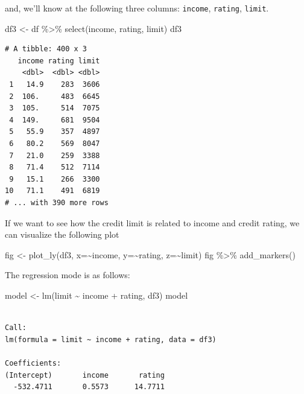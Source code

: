 \documentclass[
  letterpaper,
  DIV=11,
  numbers=noendperiod]{scrartcl}
\newenvironment{Shaded}{\begin{snugshade}}{\end{snugshade}}
\newcommand{\AttributeTok}[1]{\textcolor[rgb]{0.40,0.45,0.13}{#1}}
\newcommand{\FunctionTok}[1]{\textcolor[rgb]{0.28,0.35,0.67}{#1}}
\newcommand{\NormalTok}[1]{\textcolor[rgb]{0.00,0.23,0.31}{#1}}
\newcommand{\OtherTok}[1]{\textcolor[rgb]{0.00,0.23,0.31}{#1}}
\newcommand{\SpecialCharTok}[1]{\textcolor[rgb]{0.37,0.37,0.37}{#1}}
\begin{document}
and, we'll know at the following three columns: \texttt{income},
\texttt{rating}, \texttt{limit}.

\begin{Shaded}
\begin{Highlighting}[]
\NormalTok{df3 }\OtherTok{\textless{}{-}}\NormalTok{ df }\SpecialCharTok{\%\textgreater{}\%} \FunctionTok{select}\NormalTok{(income, rating, limit)}
\NormalTok{df3}
\end{Highlighting}
\end{Shaded}

\begin{verbatim}
# A tibble: 400 x 3
   income rating limit
    <dbl>  <dbl> <dbl>
 1   14.9    283  3606
 2  106.     483  6645
 3  105.     514  7075
 4  149.     681  9504
 5   55.9    357  4897
 6   80.2    569  8047
 7   21.0    259  3388
 8   71.4    512  7114
 9   15.1    266  3300
10   71.1    491  6819
# ... with 390 more rows
\end{verbatim}

If we want to see how the credit limit is related to income and credit
rating, we can visualize the following plot

\begin{Shaded}
\begin{Highlighting}[]
\NormalTok{fig }\OtherTok{\textless{}{-}} \FunctionTok{plot\_ly}\NormalTok{(df3, }\AttributeTok{x=}\SpecialCharTok{\textasciitilde{}}\NormalTok{income, }\AttributeTok{y=}\SpecialCharTok{\textasciitilde{}}\NormalTok{rating, }\AttributeTok{z=}\SpecialCharTok{\textasciitilde{}}\NormalTok{limit)}
\NormalTok{fig }\SpecialCharTok{\%\textgreater{}\%} \FunctionTok{add\_markers}\NormalTok{()}
\end{Highlighting}
\end{Shaded}

The regression mode is as follows:

\begin{Shaded}
\begin{Highlighting}[]
\NormalTok{model }\OtherTok{\textless{}{-}} \FunctionTok{lm}\NormalTok{(limit }\SpecialCharTok{\textasciitilde{}}\NormalTok{ income }\SpecialCharTok{+}\NormalTok{ rating, df3)}
\NormalTok{model}
\end{Highlighting}
\end{Shaded}

\begin{verbatim}

Call:
lm(formula = limit ~ income + rating, data = df3)

Coefficients:
(Intercept)       income       rating  
  -532.4711       0.5573      14.7711  
\end{verbatim}
\end{document}
